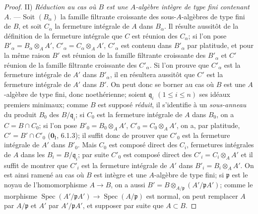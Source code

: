 \begin{proof}
II) \emph{Réduction au cas où $B$ est une $A$-algèbre intègre de type fini
contenant $A$.} --- Soit $(B_\alpha)$ la famille filtrante croissante des
sous-$A$-algèbres de type fini de $B$, et soit $C_\alpha$ la fermeture
intégrale de $A$ dans $B_\alpha$. Il résulte aussitôt de la définition de
la fermeture intégrale que $C$ est réunion des $C_\alpha$; si l'on pose
$B'_\alpha=B_\alpha\otimes_A A'$, $C'_\alpha=C_\alpha\otimes_A A'$,
$C'_\alpha$ est contenu dans $B'_\alpha$ par platitude, et pour la même
raison $B'$ est réunion de la famille filtrante croissante des
$B'_\alpha$ et $C'$ réunion de la famille filtrante croissante des
$C'_\alpha$. Si l'on prouve que $C'_\alpha$ est la fermeture intégrale de
$A'$ dans $B'_\alpha$, il en résultera aussitôt que $C'$ est la fermeture
intégrale de $A'$ dans $B'$. On peut donc se borner au cas où $B$ est une
$A$-algèbre de type fini, donc noethérienne; soient $\mathfrak q_i$
$(1\leqslant i\leqslant n)$ ses idéaux premiers minimaux; comme $B$ est
supposé \emph{réduit}, il s'identifie à un \emph{sous-anneau} du produit $B_0$ des
$B/\mathfrak q_i$; si $C_0$ est la fermeture intégrale de $A$ dans $B_0$,
on a $C=B\cap C_0$; si l'on pose $B'_0=B_0\otimes_A A'$,
$C'_0=C_0\otimes_A A'$, on a, par platitude,
$C'=B'\cap C'_0$ ($\mathbf{0}_{\mathrm I}$, 6.1.3); il suffit donc de prouver que
$C'_0$ est la fermeture intégrale de $A'$ dans $B'_0$. Mais $C_0$ est
composé direct des $C_i$, fermetures intégrales de $A$ dans les
$B_i=B/\mathfrak q_i$; par suite $C'_0$ est composé direct des
$C'_i=C_i\otimes_A A'$ et il suffit de montrer que $C'_i$ est la fermeture
intégrale de $A'$ dans $B'_i=B_i\otimes_A A'$. On est ainsi ramené au cas
où $B$ est intègre et une $A$-algèbre de type fini; si $\mathfrak p$ est le
noyau de l'homomorphisme $A\to B$, on a aussi
$B'=B\otimes_{A/\mathfrak p}(A'/\mathfrak pA')$; comme le morphisme
$\operatorname{Spec}(A'/\mathfrak pA')\to
\operatorname{Spec}(A/\mathfrak p)$ est normal, on peut remplacer $A$ par
$A/\mathfrak p$ et $A'$ par $A'/\mathfrak pA'$, et supposer par suite que
$A\subset B$.


\end{proof}
